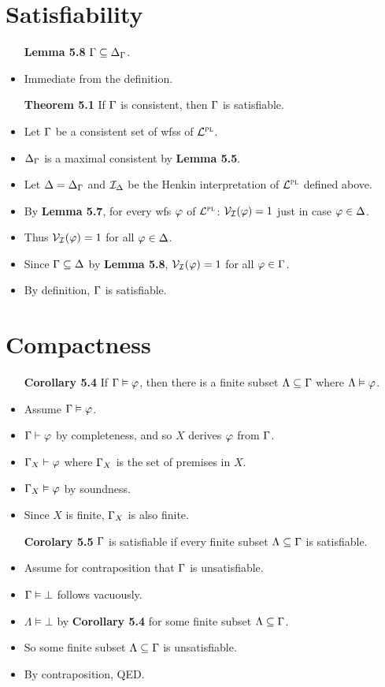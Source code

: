 \documentclass[a4paper, 11pt]{article} %
\begin{document}
\section*{Satisfiability}

\begin{itemize}
  \item[\bf Lemma 5.8] $\Gamma\subseteq\Delta_{\Gamma}$.
    \item Immediate from the definition.
  \item[\bf Theorem 5.1] If $\Gamma$ is consistent, then $\Gamma$ is satisfiable.
    \item Let $\Gamma$ be a consistent set of wfss of $\mathcal{L}^{\textsc{pl}}$.
    \item $\Delta_{\Gamma}$ is a maximal consistent by \textbf{Lemma 5.5}.
    \item Let $\Delta=\Delta_{\Gamma}$ and $\mathcal{I}_{\Delta}$ be the Henkin interpretation of $\mathcal{L}^{\textsc{pl}}$ defined above.
    \item By \textbf{Lemma 5.7}, for every wfs $\varphi$ of $\mathcal{L}^{\textsc{pl}}$: $\mathcal{V}_{\mathcal{I}}(\varphi) = 1$ just in case $\varphi \in \Delta$.
    \item Thus $\mathcal{V}_{\mathcal{I}}(\varphi) = 1$ for all $\varphi \in \Delta$.
    \item Since $\Gamma \subseteq \Delta$ by \textbf{Lemma 5.8}, $\mathcal{V}_{\mathcal{I}}(\varphi) = 1$ for all $\varphi \in \Gamma$.
    \item By definition, $\Gamma$ is satisfiable.
\end{itemize}





\section*{Compactness}

\begin{itemize}
  \item[\bf Corollary 5.4] If $\Gamma\vDash\varphi$, then there is a finite subset $\Lambda\subseteq\Gamma$ where $\Lambda\vDash\varphi$.
    \item Assume $\Gamma\vDash\varphi$. 
    \item $\Gamma\vdash\varphi$ by completeness, and so $X$ derives $\varphi$ from $\Gamma$. 
    \item $\Gamma_X\vdash\varphi$ where $\Gamma_X$ is the set of premises in $X$.
    \item $\Gamma_X\vDash\varphi$ by soundness. 
    \item Since $X$ is finite, $\Gamma_X$ is also finite. 
  \item[\bf Corolary 5.5] $\Gamma$ is satisfiable if every finite subset $\Lambda\subseteq\Gamma$ is satisfiable.
    \item Assume for contraposition that $\Gamma$ is unsatisfiable. 
    \item $\Gamma\vDash\bot$ follows vacuously.
    \item $\Lambda\vDash\bot$ by \textbf{Corollary 5.4} for some finite subset $\Lambda\subseteq\Gamma$.
    \item So some finite subset $\Lambda\subseteq\Gamma$ is unsatisfiable. 
    \item By contraposition, QED.
\end{itemize}
  
\end{document}
